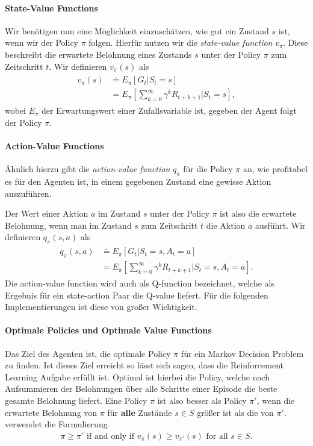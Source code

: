 \paragraph{State-Value Functions}
Wir benötigen nun eine Möglichkeit einzuschätzen, wie gut ein Zustand $ s $ ist, wenn wir der Policy $ \pi $ folgen. Hierfür nutzen wir die \textit{state-value function} $ v_\pi $. Diese beschreibt die erwartete Belohnung eines Zustands $ s $ unter der Policy $ \pi $ zum Zeitschritt $ t $. Wir definieren $ v_\pi(s) $ als
\begin{align}
    \begin{split}
    v_\pi(s) & \doteq E_\pi \left[G_t | S_t = s \right]\\
    & = E_\pi \left[\sum_{k = 0}^{\infty} \gamma^k R_{t + k + 1} | S_t = s \right],
    \end{split}
\end{align}
wobei $ E_\pi $ der Erwartungswert einer Zufallsvariable ist, gegeben der Agent folgt der Policy $ \pi $.

\paragraph{Action-Value Functions}
Ähnlich hierzu gibt die \textit{action-value function} $ q_\pi $ für die Policy $ \pi $ an, wie profitabel es für den Agenten ist, in einem gegebenen Zustand eine gewisse Aktion auszuführen.

Der Wert einer Aktion $ a $ im Zustand $ s $ unter der Policy $ \pi $ ist also die erwartete Belohnung, wenn man im Zustand $ s $ zum Zeitschritt $ t $ die Aktion $ a $ ausführt. Wir definieren $ q_\pi(s, a) $ als
\begin{align}
    \begin{split}
    q_\pi(s,a) & \doteq E_\pi \left[G_t | S_t = s, A_t = a \right]\\
    & = E_\pi \left[\sum_{k = 0}^{\infty} \gamma^k R_{t + k + 1} | S_t = s, A_t = a \right].
    \end{split}
\end{align}
Die action-value function wird auch als Q-function bezeichnet, welche als Ergebnis für ein state-action Paar die Q-value liefert. Für die folgenden Implementierungen ist diese von großer Wichtigkeit.

\paragraph{Optimale Policies und Optimale Value Functions}
Das Ziel des Agenten ist, die optimale Policy $ \pi $ für ein Markov Decision Problem zu finden. Ist dieses Ziel erreicht so lässt sich sagen, dass die Reinforcement Learning Aufgabe erfüllt ist. Optimal ist hierbei die Policy, welche nach Aufsummieren der Belohnungen über alle Schritte einer Episode die beste gesamte Belohnung liefert. Eine Policy $ \pi $ ist also besser als Policy $ \pi' $, wenn die erwartete Belohnung von $ \pi $ für \textbf{alle} Zustände $ s \in S $ größer ist als die von $ \pi' $. \cite{06_sutton2018reinforcement} verwendet die Formulierung
\begin{align}
    \pi \geq \pi' \text{ if and only if } v_\pi(s) \geq v_{\pi'}(s) \text{ for all } s \in S.
\end{align}

